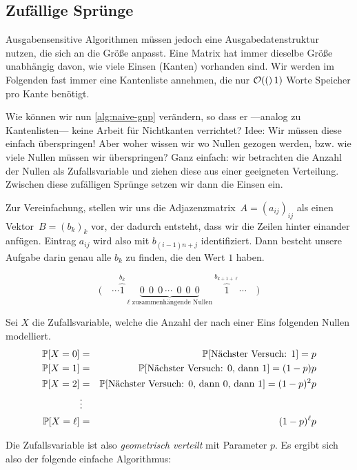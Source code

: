 \subsection{Zufällige Sprünge}
Ausgabensensitive  Algorithmen müssen jedoch eine Ausgabedatenstruktur nutzen, die sich an die Größe anpasst.
Eine Matrix hat immer dieselbe Größe unabhängig davon, wie viele Einsen (Kanten) vorhanden sind.
Wir werden im Folgenden fast immer eine Kantenliste annehmen, die nur $\mathcal{O}\!\left((\right)1)$ Worte Speicher pro Kante benötigt.

Wie können wir nun \cref{alg:naive-gnp} verändern, so dass er ---analog zu Kantenlisten--- keine Arbeit für Nichtkanten verrichtet?
Idee: Wir müssen diese einfach überspringen!
Aber woher wissen wir wo \glqq Nullen\grqq{} gezogen werden, bzw. wie viele Nullen müssen wir überspringen?
Ganz einfach: wir betrachten die Anzahl der Nullen als Zufallsvariable und ziehen diese aus einer geeigneten Verteilung.
Zwischen diese zufälligen Sprünge setzen wir dann die Einsen ein.

Zur Vereinfachung, stellen wir uns die Adjazenzmatrix~$A = (a_{ij})_{ij}$ als einen Vektor~$B = (b_k)_k$ vor, der dadurch entsteht, dass wir die Zeilen hinter einander anfügen.
Eintrag $a_{ij}$ wird also mit $b_{(i-1)n + j}$ identifiziert.
Dann besteht unsere Aufgabe darin genau alle $b_k$ zu finden, die den Wert $1$ haben.

\begin{equation}
    \Big(\quad \cdots \overbrace{1}^{b_k} \ \underbrace{0 \ \ 0\ \ 0 \ \cdots\ \ 0\ \ 0\ \ 0}_{\text{$\ell$ zusammenhängende Nullen}}\  \overbrace{1}^{b_{k + 1+ \ell}} \cdots \quad \Big)
\end{equation}

\noindent
Sei $X$ die Zufallsvariable, welche die Anzahl der nach einer Eins folgenden Nullen modelliert.
\begin{eqnarray}
    \mathbb{P}\!\left[X = 0\right] &=& \mathbb{P}\!\left[\text{Nächster Versuch: 1}\right] = p \\
    \mathbb{P}\!\left[X = 1\right] &=& \mathbb{P}\!\left[\text{Nächster Versuch: 0, dann 1}\right] = (1 - p)p \\
    \mathbb{P}\!\left[X = 2\right] &=& \mathbb{P}\!\left[\text{Nächster Versuch: 0, dann 0, dann 1}\right] = (1 - p)^2 p \\
    &\vdots& \\
    \mathbb{P}\!\left[X = \ell\right] &=& (1 - p)^\ell p
\end{eqnarray}

\noindent Die Zufallsvariable ist also \emph{geometrisch verteilt} mit Parameter $p$.
Es ergibt sich also der folgende einfache Algorithmus:

